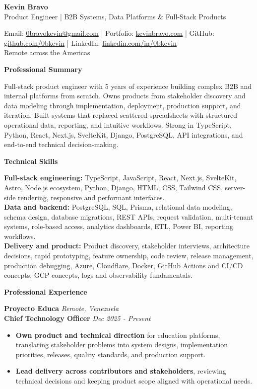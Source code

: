\documentclass[10pt]{article}
\newcommand{\sectiontitle}[1]{%
    \vspace{3pt}
    \begin{center}
        \textbf{#1}
    \end{center}
    \vspace{-7pt}
}
\begin{document}
\raggedright

\begin{center}
    {\LARGE \textbf{Kevin Bravo}}\\
    Product Engineer | B2B Systems, Data Platforms \& Full-Stack Products \\
    \hrulefill
\end{center}

\begin{center}
    Email: \href{mailto:0bravokevin@gmail.com}{0bravokevin@gmail.com}
    | Portfolio: \href{https://kevinbravo.com}{kevinbravo.com}
    | GitHub: \href{https://github.com/0bkevin}{github.com/0bkevin}
    | LinkedIn: \href{https://www.linkedin.com/in/0bkevin/}{linkedin.com/in/0bkevin} \\
    Remote across the Americas
\end{center}

\fontsize{9.6}{10.7}\selectfont

\sectiontitle{Professional Summary}
Full-stack product engineer with 5 years of experience building complex B2B and internal platforms from scratch. Owns products from stakeholder discovery and data modeling through implementation, deployment, production support, and iteration. Built systems that replaced scattered spreadsheets with structured operational data, reporting, and intuitive workflows. Strong in TypeScript, Python, React, Next.js, SvelteKit, Django, PostgreSQL, API integrations, and end-to-end technical decision-making.

\sectiontitle{Technical Skills}
\textbf{Full-stack engineering:} TypeScript, JavaScript, React, Next.js, SvelteKit, Astro, Node.js ecosystem, Python, Django, HTML, CSS, Tailwind CSS, server-side rendering, responsive and performant interfaces. \\
\textbf{Data and backend:} PostgreSQL, SQL, Prisma, relational data modeling, schema design, database migrations, REST APIs, request validation, multi-tenant systems, role-based access, analytics dashboards, ETL, Power BI, reporting workflows. \\
\textbf{Delivery and product:} Product discovery, stakeholder interviews, architecture decisions, rapid prototyping, feature ownership, code review, release management, production debugging, Azure, Cloudflare, Docker, GitHub Actions and CI/CD concepts, GCP concepts, logs and observability fundamentals.

\sectiontitle{Professional Experience}

\textbf{Proyecto Educa} \hfill \textit{Remote, Venezuela} \\
\textbf{Chief Technology Officer} \hfill \textit{Dec 2025 - Present}
\begin{itemize}
    \item \textbf{Own product and technical direction} for education platforms, translating stakeholder problems into system designs, implementation priorities, releases, quality standards, and production support.
    \item \textbf{Lead delivery across contributors and stakeholders}, reviewing technical decisions and keeping product scope aligned with operational needs.
\end{itemize}
\end{document}
